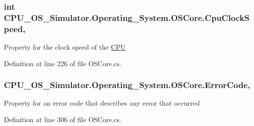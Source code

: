 \subsubsection[{Cpu\+Clock\+Speed}]{\setlength{\rightskip}{0pt plus 5cm}int C\+P\+U\+\_\+\+O\+S\+\_\+\+Simulator.\+Operating\+\_\+\+System.\+O\+S\+Core.\+Cpu\+Clock\+Speed\hspace{0.3cm}{\ttfamily [get]}, {\ttfamily [set]}}\label{class_c_p_u___o_s___simulator_1_1_operating___system_1_1_o_s_core_a1ea93a6cc37dbae4bc607d09fd6e75db}


Property for the clock speed of the \hyperlink{namespace_c_p_u___o_s___simulator_1_1_c_p_u}{C\+P\+U} 



Definition at line 226 of file O\+S\+Core.\+cs.

\hypertarget{class_c_p_u___o_s___simulator_1_1_operating___system_1_1_o_s_core_a77a647e293c14574919b144cb2e8998f}{}
\subsubsection[{Error\+Code}]{ C\+P\+U\+\_\+\+O\+S\+\_\+\+Simulator.\+Operating\+\_\+\+System.\+O\+S\+Core.\+Error\+Code\hspace{0.3cm}{\ttfamily [get]}, {\ttfamily [set]}}\label{class_c_p_u___o_s___simulator_1_1_operating___system_1_1_o_s_core_a77a647e293c14574919b144cb2e8998f}


Property for an error code that describes any error that occurred 



Definition at line 306 of file O\+S\+Core.\+cs.

\hypertarget{class_c_p_u___o_s___simulator_1_1_operating___system_1_1_o_s_core_ac620c813df8b2c9ea386cff20d3fee84}{}
